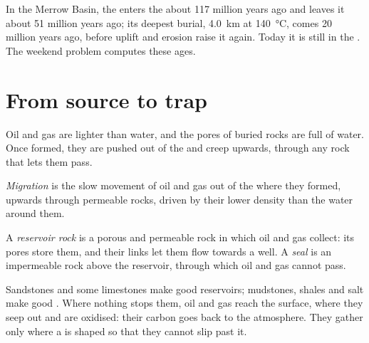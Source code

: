 In the Merrow Basin, the  enters the  about 117
million years ago and leaves it about 51 million years ago; its deepest
burial, \qty{4.0}{km} at \qty{140}{\degreeCelsius}, comes 20 million years
ago, before uplift and erosion raise it again. Today it is still in the . The weekend problem computes these ages.

\section{From source to trap}

Oil and gas are lighter than water, and the pores of buried rocks are full of
water. Once formed, they are pushed out of the  and creep upwards,
through any rock that lets them pass.

\begin{definition}[Migration]\label{def:g11:fossil-fuel-geology:migration}
\emph{Migration} is the slow movement of
oil and gas out of the  where they formed, upwards through
permeable rocks, driven by their lower density than the water around them.
\end{definition}

\begin{definition}\label{def:g11:fossil-fuel-geology:reservoir}
A \emph{reservoir rock} is a porous and permeable
rock in which oil and gas collect: its pores store them, and their links
let them flow towards a well. A \emph{seal} is an
impermeable rock above the reservoir, through which oil and gas cannot
pass.
\end{definition}

Sandstones and some limestones make good reservoirs; mudstones, shales and
salt make good . Where nothing stops them, oil and gas reach the
surface, where they seep out and are oxidised: their carbon goes back to the
atmosphere. They gather only where a  is shaped so that they cannot
slip past it.

